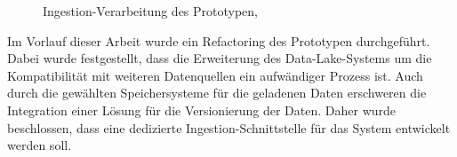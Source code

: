 \begin{figure}
    \centering
    \caption[Ingestion-Verarbeitung des Prototypen]{Ingestion-Verarbeitung des Prototypen, }
    \label{fig:prototyp-ingestion}
\end{figure}

Im Vorlauf dieser Arbeit wurde ein Refactoring des Prototypen durchgeführt.
Dabei wurde festgestellt, dass die Erweiterung des Data-Lake-Systems um die Kompatibilität mit weiteren Datenquellen ein aufwändiger Prozess ist.
Auch durch die gewählten Speichersysteme für die geladenen Daten erschweren die Integration einer Lösung für die Versionierung der Daten.
Daher wurde beschlossen, dass eine dedizierte Ingestion-Schnittstelle für das System entwickelt werden soll.